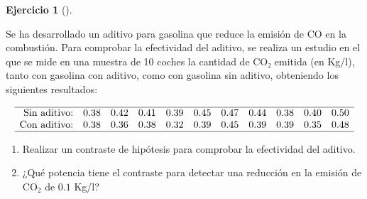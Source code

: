 \documentclass[
  a4paper,
]{scrreport}
\theoremstyle{definition}
\newtheorem{exercise}{Ejercicio}[chapter]
\theoremstyle{remark}
\begin{document}
\begin{tcolorbox}[enhanced jigsaw, colframe=quarto-callout-tip-color-frame, breakable, opacityback=0, titlerule=0mm, opacitybacktitle=0.6, bottomtitle=1mm, toptitle=1mm, colback=white, leftrule=.75mm, colbacktitle=quarto-callout-tip-color!10!white, arc=.35mm, rightrule=.15mm, left=2mm, bottomrule=.15mm, toprule=.15mm, title=\textcolor{quarto-callout-tip-color}{\faLightbulb}\hspace{0.5em}{Solución}, coltitle=black]

\end{tcolorbox}

\begin{exercise}[]\protect\hypertarget{exr-contraste-media-emision-CO2}{}\label{exr-contraste-media-emision-CO2}

Se ha desarrollado un aditivo para gasolina que reduce la emisión de CO
en la combustión. Para comprobar la efectividad del aditivo, se realiza
un estudio en el que se mide en una muestra de 10 coches la cantidad de
CO₂ emitida (en Kg/l), tanto con gasolina con aditivo, como con gasolina
sin aditivo, obteniendo los siguientes resultados:

\[
\begin{array}{rcccccccccc}
\hline
\mbox{Sin aditivo:}  & 0.38 & 0.42 & 0.41 & 0.39 & 0.45 & 0.47 & 0.44 & 0.38 & 0.40 & 0.50  \\
\mbox{Con  aditivo:} & 0.38 & 0.36 & 0.38 & 0.32 & 0.39 & 0.45 & 0.39 & 0.39 & 0.35 & 0.48 \\
\hline
\end{array}
\]

\begin{enumerate}
\def\labelenumi{\alph{enumi}.}
\item
  Realizar un contraste de hipótesis para comprobar la efectividad del
  aditivo.
\item
  ¿Qué potencia tiene el contraste para detectar una reducción en la
  emisión de CO\(_2\) de \(0.1\) Kg/l?
\end{enumerate}

\end{exercise}
\end{document}
